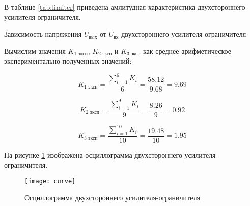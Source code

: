 В таблице \ref{tab:limiter} приведена амлитудная характеристика двухстороннего усилителя-ограничителя.

\begin{table}[H]
\begin{center}
	\caption{Зависимость напряжения $U_\text{вых}$ от $U_\text{вх}$ двухстороннего усилителя-ограничителя}
	\label{tab:limiter}
	\def\tabcolsep{20pt}
	\def\arraystretch{1.23}
	\fontsize{13}{14}\selectfont
\end{center}
\end{table}

Вычислим значения $K_{1 \text{ эксп}}$, $K_{2 \text{ эксп}}$ и $K_{3 \text{ эксп}}$ как среднее арифметическое экспериментально полученных значений:

\begin{displaymath}
	K_{1 \text{ эксп}} = \frac{\sum_{i=1}^{6}K_i}{6} = \frac{58.12}{9.68} = 9.69
\end{displaymath}

\begin{displaymath}
	K_{2 \text{ эксп}} = \frac{\sum_{i=1}^{9}K_i}{9} = \frac{8.26}{9} = 0.92
\end{displaymath}

\begin{displaymath}
	K_{3 \text{ эксп}} = \frac{\sum_{i=1}^{10}K_i}{10} = \frac{19.48}{10} = 1.95
\end{displaymath}

На рисунке \ref{fig:oscillogram} изображена осциллограмма двухстороннего усилителя-ограничителя.

\begin{figure}[H]
\begin{center}
	\texttt{[image: curve]}
	\caption{Осциллограмма двухстороннего усилителя-ограничителя}
	\label{fig:oscillogram}
\end{center}
\end{figure}

